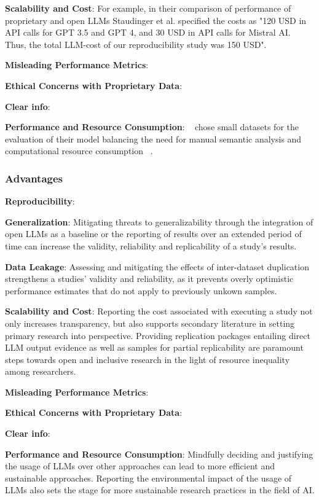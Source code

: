 \textbf{Scalability and Cost}:
For example, in their comparison of performance of proprietary and open LLMs Staudinger et al. specified the costs as "120 USD in API calls for GPT 3.5 and GPT 4, and 30 USD in API calls for Mistral AI. Thus, the total LLM-cost of our reproducibility study was 150 USD". ~\cite{DBLP:conf/sigir-ap/StaudingerKPLH24}

\textbf{Misleading Performance Metrics}:

\textbf{Ethical Concerns with Proprietary Data}:

\textbf{Clear info}:

\textbf{Performance and Resource Consumption}:
~\cite{tinnessoftware} chose small datasets for the evaluation of their model balancing the need for manual semantic analysis and computational resource consumption ~\cite{tinnessoftware}.

\subsubsection{Advantages}
\textbf{Reproducibility}:

\textbf{Generalization}:
Mitigating threats to generalizability through the integration of open LLMs as a baseline or the reporting of results over an extended period of time can increase the validity, reliability and replicability of a study's results.

\textbf{Data Leakage}:
Assessing and mitigating the effects of inter-dataset duplication strengthens a studies' validity and reliability, as it prevents overly optimistic performance estimates that do not apply to previously unkown samples.

\textbf{Scalability and Cost}:
Reporting the cost associated with executing a study not only increases transparency, but also supports secondary literature in setting primary research into perspective.
Providing replication packages entailing direct LLM output evidence as well as samples for partial replicability are paramount steps towards open and inclusive research in the light of resource inequality among researchers.

\textbf{Misleading Performance Metrics}:

\textbf{Ethical Concerns with Proprietary Data}:

\textbf{Clear info}:

\textbf{Performance and Resource Consumption}:
Mindfully deciding and justifying the usage of LLMs over other approaches can lead to more efficient and sustainable approaches. 
Reporting the environmental impact of the usage of LLMs also sets the stage for more sustainable research practices in the field of AI.

